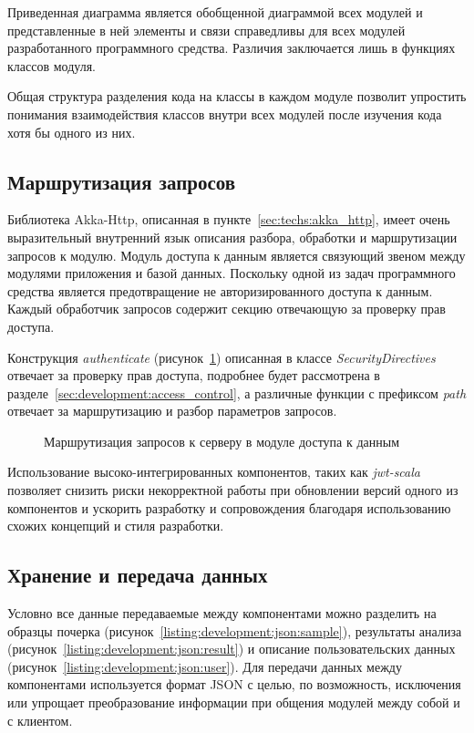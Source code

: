 Приведенная диаграмма является обобщенной диаграммой всех модулей и представленные в ней элементы и связи справедливы для всех модулей разработанного программного средства. Различия заключается лишь в функциях классов модуля.

Общая структура разделения кода на классы в каждом модуле позволит упростить понимания взаимодействия классов внутри всех модулей после изучения кода хотя бы одного из них.

\subsection{Маршрутизация запросов}
Библиотека Akka-Http, описанная в пункте~\ref{sec:techs:akka_http}, имеет очень выразительный внутренний язык описания разбора, обработки и маршрутизации запросов к модулю. Модуль доступа к данным является связующий звеном между модулями приложения и базой данных. Поскольку одной из задач программного средства является предотвращение не авторизированного доступа к данным. Каждый обработчик запросов содержит секцию отвечающую за проверку прав доступа.

Конструкция \emph{authenticate} (рисунок~\ref{listing:development:db_rout}) описанная в классе \emph{SecurityDirectives} отвечает за проверку прав доступа, подробнее будет рассмотрена в разделе~\ref{sec:development:access_control}, а различные функции с префиксом \emph{path} отвечает за маршрутизацию и разбор параметров запросов. 

\begin{figure}[ht]
    \centering
    
    \caption{Маршрутизация запросов к серверу в модуле доступа к данным}
    \label{listing:development:db_rout}
\end{figure}

Использование высоко-интегрированных компонентов, таких как \emph{jwt-scala} позволяет снизить риски некорректной работы при обновлении версий одного из компонентов и ускорить разработку и сопровождения благодаря использованию схожих концепций и стиля разработки.

\subsection{Хранение и передача данных}

Условно все данные передаваемые между компонентами можно разделить на образцы почерка (рисунок~\ref{listing:development:json:sample}), результаты анализа (рисунок~\ref{listing:development:json:result}) и описание пользовательских данных (рисунок~\ref{listing:development:json:user}). Для передачи данных между компонентами используется формат JSON с целью, по возможность, исключения или упрощает преобразование информации при общения модулей между собой и с клиентом. 

